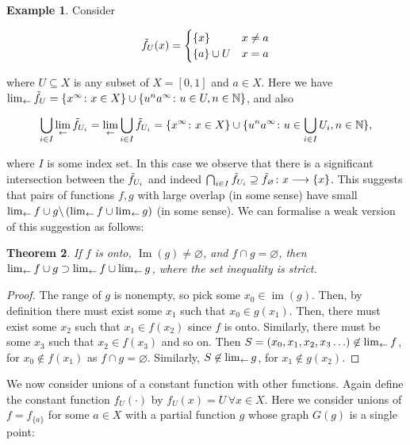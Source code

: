 \documentclass{article}
\newtheorem{thm}{Theorem}
\theoremstyle{definition}
\newtheorem{exam}[thm]{Example}
\let\emptyset\varnothing
\begin{document}
\begin{exam}
Consider

\begin{equation}
  \tilde{f}_{U}(x) = \begin{cases}
    \lbrace x\rbrace & x\neq a\\
    \lbrace a\rbrace\cup U & x=a
  \end{cases}
\end{equation}

where $U\subseteq X$ is any subset of $X=[0,1]$ and $a\in X$.  Here we
have $\lim_{\leftarrow} \tilde{f}_{U}=\lbrace x^\infty\colon x\in X\rbrace\cup\lbrace
u^na^\infty\colon u\in U, n\in\mathbb{N}\rbrace$, and also

\begin{equation}
  \bigcup_{i\in I}\lim_{\leftarrow} \tilde{f}_{U_i}=
  \lim_{\leftarrow} \bigcup_{i\in I}\tilde{f}_{U_i}=
  \lbrace x^\infty\colon x\in X\rbrace\cup\lbrace
  u^na^\infty\colon u\in\bigcup_{i\in I}U_i, n\in\mathbb{N}\rbrace,
\end{equation}
\end{exam}

where $I$ is some index set.  In this case we observe that there is a
significant intersection between the $\tilde{f}_{U_i}$ and indeed
$\bigcap_{i\in I}\ft{U_i}\supseteq\ft{\emptyset}\colon x\longrightarrow\lbrace
x\rbrace$.  This suggests that pairs of functions $f,g$ with large overlap
(in some sense) have small $\lim_{\leftarrow} f\cup
  g\backslash\left(\lim_{\leftarrow} f\cup\lim_{\leftarrow} g\right)$ (in some sense).
We can formalise a weak version of this suggestion as follows:

\begin{thm}
If $f$ is onto, $\operatorname{Im}(g)\neq\emptyset$, and $f\cap
g=\emptyset$, then  $\lim_{\leftarrow} f\cup g\supset\lim_{\leftarrow} f\cup\lim_{\leftarrow} g$,
where the set inequality is strict.
\end{thm}

\begin{proof}
The range of $g$ is nonempty, so pick some
$x_0\in\operatorname{im}(g)$.  Then, by definition there must exist
some $x_1$ such that $x_0 \in g(x_1)$.  Then, there must exist some
$x_2$ such that $x_1\in f(x_2)$ since $f$ is onto.  Similarly, there
must be some $x_3$ such that $x_2\in f(x_3)$ and so on.  Then $S=(x_0,
x_1, x_2, x_3\ldots)\not\in\lim_{\leftarrow} f$, for $x_0\not\in f(x_1)$ as
$f\cap g=\emptyset$.  Similarly, $S\not\in\lim_{\leftarrow} g$, for $x_1\not\in
g(x_2)$.
\end{proof}

We now consider unions of a constant function with other functions.
Again define the constant function $f_{U}(\cdot)$ by
$f_U(x)=U\,\forall x\in X$.  Here we consider unions of $f=f_{\lbrace
  a\rbrace}$ for some $a\in X$ with a partial function $g$ whose graph
$G(g)$ is a single point:
\end{document}
